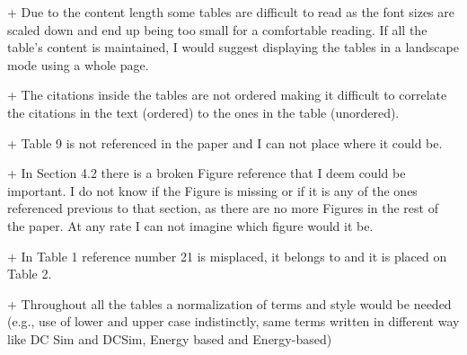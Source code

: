 


+ Due to the content length some tables are difficult to read as the
font sizes are scaled down and end up being too small for a
comfortable reading. If all the table's content is maintained, I would
suggest displaying the tables in a landscape mode using a whole page.


+ The citations inside the tables are not ordered making it difficult
to correlate the citations in the text (ordered) to the ones in the
table (unordered).


+ Table 9 is not referenced in the paper and I can not place where it
could be.


+ In Section 4.2 there is a broken Figure reference that I deem could
be important. I do not know if the Figure is missing or if it is any
of the ones referenced previous to that section, as there are no more
Figures in the rest of the paper. At any rate I can not imagine which
figure would it be.


+ In Table 1 reference number 21 is misplaced, it belongs to and it is
placed on Table 2.


+ Throughout all the tables a normalization of terms and style would
be needed (e.g., use of lower and upper case indistinctly, same terms
written in different way like DC Sim and DCSim,
Energy based and
Energy-based)




